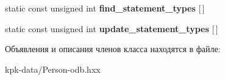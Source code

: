 \begin{DoxyCompactItemize}
\item 
static const unsigned int {\bfseries find\+\_\+statement\+\_\+types} \mbox{[}$\,$\mbox{]}\hypertarget{classodb_1_1access_1_1object__traits__impl_3_01_1_1kpk_1_1data_1_1_person_00_01id__pgsql_01_4_a101cd3d3427ec2c2e07aae11f4c65364}{}\label{classodb_1_1access_1_1object__traits__impl_3_01_1_1kpk_1_1data_1_1_person_00_01id__pgsql_01_4_a101cd3d3427ec2c2e07aae11f4c65364}

\item 
static const unsigned int {\bfseries update\+\_\+statement\+\_\+types} \mbox{[}$\,$\mbox{]}\hypertarget{classodb_1_1access_1_1object__traits__impl_3_01_1_1kpk_1_1data_1_1_person_00_01id__pgsql_01_4_a71b82901e95036650c4349f8fc38575e}{}\label{classodb_1_1access_1_1object__traits__impl_3_01_1_1kpk_1_1data_1_1_person_00_01id__pgsql_01_4_a71b82901e95036650c4349f8fc38575e}

\end{DoxyCompactItemize}


Объявления и описания членов класса находятся в файле\+:\begin{DoxyCompactItemize}
\item 
kpk-\/data/Person-\/odb.\+hxx\end{DoxyCompactItemize}
